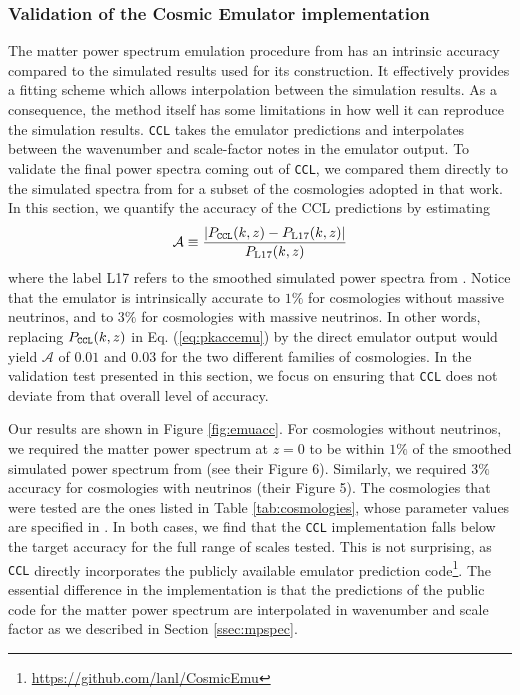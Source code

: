 \documentclass[\docopts]{\docclass}
\newcommand{\ccl}{{\tt CCL}\xspace}
\begin{document}
\subsubsection{Validation of the Cosmic Emulator implementation}
\label{ss:cosmicemu}

The matter power spectrum emulation procedure from \citet{Lawrence17} has an intrinsic accuracy compared to the simulated results used for its construction. It effectively provides a fitting scheme which allows interpolation between the simulation results. As a consequence, the method itself has some limitations in how well it can reproduce the simulation results. \ccl takes the emulator predictions and interpolates between the wavenumber and scale-factor notes in the emulator output. To validate the final power spectra coming out of \ccl, we compared them directly to the simulated spectra from \citet{Lawrence17} for a subset of the cosmologies adopted in that work. In this section, we quantify the accuracy of the CCL predictions by estimating
\begin{equation}
  \mathcal{A}\equiv\frac{|P_{\tt CCL}(k,z)-P_{\rm L17}(k,z)|}{P_{\rm L17}(k,z)}
  \label{eq:pkaccemu}
\end{equation}
where the label L17 refers to the smoothed simulated power spectra from \citet{Lawrence17}. Notice that the emulator is intrinsically accurate to $1\%$ for cosmologies without massive neutrinos, and to $3\%$ for cosmologies with massive neutrinos. In other words, replacing $P_{\tt CCL}(k,z)$ in Eq. (\ref{eq:pkaccemu}) by the direct emulator output would yield $\mathcal{A}$ of $0.01$ and $0.03$ for the two different families of cosmologies. In the validation test presented in this section, we focus on ensuring that \ccl does not deviate from that overall level of accuracy.

Our results are shown in Figure \ref{fig:emuacc}. For cosmologies without neutrinos, we required the matter power spectrum at $z=0$ to be within $1\%$ of the smoothed simulated power spectrum from \citet{Lawrence17} (see their Figure 6). Similarly, we required $3\%$ accuracy for cosmologies with neutrinos (their Figure 5). The cosmologies that were tested are the ones listed in Table \ref{tab:cosmologies}, whose parameter values are specified in \citet{Lawrence17}. In both cases, we find that the \ccl implementation falls below the target accuracy for the full range of scales tested. This is not surprising, as \ccl directly incorporates the publicly available emulator prediction code\footnote{\url{https://github.com/lanl/CosmicEmu}}. The essential difference in the implementation is that the predictions of the public code for the matter power spectrum are interpolated in wavenumber and scale factor as we described in Section \ref{ssec:mpspec}.
\end{document}
